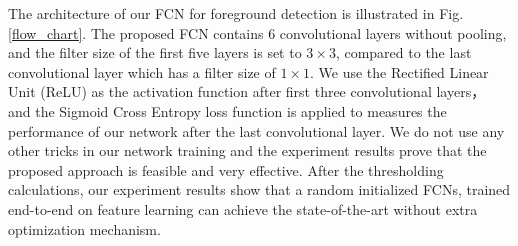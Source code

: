 \documentclass[journal]{IEEEtran}
\newcommand{\reffig}[1]{Fig. \ref{#1}}
\begin{document}
The architecture of our FCN for foreground detection is illustrated in \reffig{flow_chart}. 
The proposed FCN contains 6 convolutional layers without pooling, and the filter size of the first five layers is set to $3\times 3$, compared to the last convolutional layer which has a filter size of $1\times 1$. 
We use the Rectified Linear Unit (ReLU) as the activation function after first three convolutional layers，
and the Sigmoid Cross Entropy loss function is applied to measures the performance of our network after the last convolutional layer. 
We do not use any other tricks in our network training and the experiment results prove that the proposed approach is feasible and very effective.
After the thresholding calculations, our experiment results show that a random initialized FCNs, trained end-to-end on feature learning can achieve the state-of-the-art without extra optimization mechanism.



% 
% 
\end{document}
